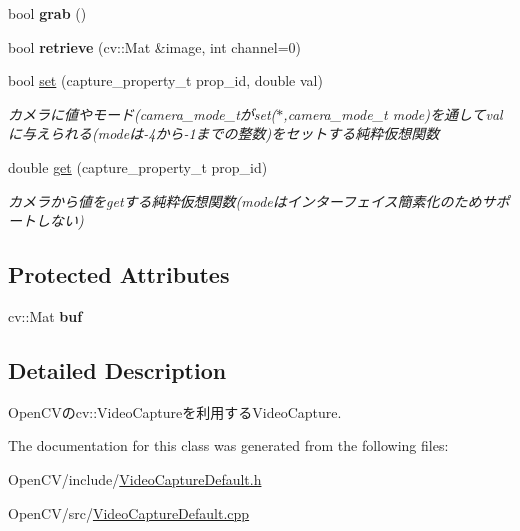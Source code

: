 \begin{DoxyCompactItemize}
\hypertarget{classskl_1_1_video_capture_default_a0667bbfc63c734b78fc5db51e7329419}{}\label{classskl_1_1_video_capture_default_a0667bbfc63c734b78fc5db51e7329419} 
bool {\bfseries grab} ()
\item 
\hypertarget{classskl_1_1_video_capture_default_ab606b047d7d5e94c6aee600c2674a3b3}{}\label{classskl_1_1_video_capture_default_ab606b047d7d5e94c6aee600c2674a3b3} 
bool {\bfseries retrieve} (cv\+::\+Mat \&image, int channel=0)
\item 
\hypertarget{classskl_1_1_video_capture_default_a626a3b49fd2ba92cc3f39a59513e8414}{}\label{classskl_1_1_video_capture_default_a626a3b49fd2ba92cc3f39a59513e8414} 
bool \hyperlink{classskl_1_1_video_capture_default_a626a3b49fd2ba92cc3f39a59513e8414}{set} (capture\+\_\+property\+\_\+t prop\+\_\+id, double val)
\begin{DoxyCompactList}\small\item\em カメラに値やモード(camera\+\_\+mode\+\_\+tがset($\ast$,camera\+\_\+mode\+\_\+t mode)を通してvalに与えられる(modeは-\/4から-\/1までの整数)をセットする純粋仮想関数 \end{DoxyCompactList}\item 
\hypertarget{classskl_1_1_video_capture_default_a17131b806cb6f62a159e3459f2c1a724}{}\label{classskl_1_1_video_capture_default_a17131b806cb6f62a159e3459f2c1a724} 
double \hyperlink{classskl_1_1_video_capture_default_a17131b806cb6f62a159e3459f2c1a724}{get} (capture\+\_\+property\+\_\+t prop\+\_\+id)
\begin{DoxyCompactList}\small\item\em カメラから値をgetする純粋仮想関数(modeはインターフェイス簡素化のためサポートしない) \end{DoxyCompactList}\end{DoxyCompactItemize}
\subsection*{Protected Attributes}
\begin{DoxyCompactItemize}
\item 
\hypertarget{classskl_1_1_video_capture_default_a6965fe5cd25ec2aa2eeac3c002b306e8}{}\label{classskl_1_1_video_capture_default_a6965fe5cd25ec2aa2eeac3c002b306e8} 
cv\+::\+Mat {\bfseries buf}
\end{DoxyCompactItemize}


\subsection{Detailed Description}
Open\+C\+Vのcv\+::\+Video\+Captureを利用する\+Video\+Capture. 

The documentation for this class was generated from the following files\+:\begin{DoxyCompactItemize}
\item 
Open\+C\+V/include/\hyperlink{_video_capture_default_8h}{Video\+Capture\+Default.\+h}\item 
Open\+C\+V/src/\hyperlink{_video_capture_default_8cpp}{Video\+Capture\+Default.\+cpp}\end{DoxyCompactItemize}
